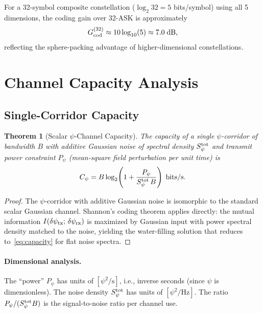 \documentclass[twocolumn,superscriptaddress,prd,nofootinbib]{revtex4-2}
\newtheorem{theorem}{Theorem}
\begin{document}
For a 32-symbol composite constellation ($\log_2 32 = 5$ bits/symbol)
using all 5 dimensions, the coding gain over 32-ASK is approximately
\begin{equation}
G_{\rm cod}^{(32)} \approx 10\log_{10}(5) \approx 7.0\;\text{dB},
\label{eq:coding-gain-32}
\end{equation}
reflecting the sphere-packing advantage of higher-dimensional
constellations.

\section{Channel Capacity Analysis}\label{sec:capacity}

\subsection{Single-Corridor Capacity}

\begin{theorem}[Scalar $\psi$-Channel Capacity]
\label{thm:capacity}
The capacity of a single $\psi$-corridor of bandwidth $B$ with additive
Gaussian noise of spectral density $S_\psi^{\rm tot}$ and transmit
power constraint $P_\psi$ (mean-square field perturbation per unit time)
is
\begin{equation}
C_\psi = B\log_2\!\left(1 + \frac{P_\psi}{S_\psi^{\rm tot}\,B}\right)
\;\text{bits/s}.
\label{eq:capacity}
\end{equation}
\end{theorem}

\begin{proof}
The $\psi$-corridor with additive Gaussian noise is isomorphic to the
standard scalar Gaussian channel.
Shannon's coding theorem applies directly: the mutual information
$I(\delta\psi_{\rm tx};\,\delta\psi_{\rm rx})$ is maximized by Gaussian
input with power spectral density matched to the noise, yielding the
water-filling solution that reduces to~\eqref{eq:capacity} for flat
noise spectra.
\end{proof}

\paragraph{Dimensional analysis.}
The ``power'' $P_\psi$ has units of $[\psi^2/\text{s}]$, i.e., inverse
seconds (since $\psi$ is dimensionless).
The noise density $S_\psi^{\rm tot}$ has units of $[\psi^2/\text{Hz}]$.
The ratio $P_\psi / (S_\psi^{\rm tot} B)$ is the signal-to-noise ratio
per channel use.
\end{document}
